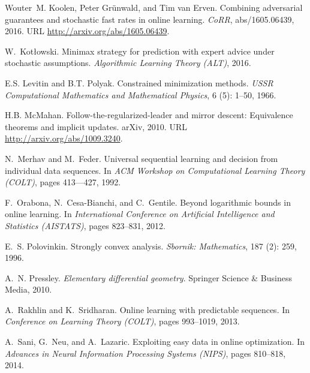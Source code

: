 \documentclass[english]{article}
\begin{document}
\begin{thebibliography}{30}
Wouter~M. Koolen, Peter Gr{\"{u}}nwald, and Tim van Erven.
\newblock Combining adversarial guarantees and stochastic fast rates in online
  learning.
\newblock \emph{CoRR}, abs/1605.06439, 2016.
\newblock URL \url{http://arxiv.org/abs/1605.06439}.

W.~Kot{\l}owski.
\newblock Minimax strategy for prediction with expert advice under stochastic
  assumptions.
\newblock \emph{Algorithmic Learning Theory (ALT)}, 2016.

E.S. Levitin and B.T. Polyak.
\newblock Constrained minimization methods.
\newblock \emph{USSR Computational Mathematics and Mathematical Physics},
  6 (5): 1--50, 1966.

H.B. McMahan.
\newblock Follow-the-regularized-leader and mirror descent: Equivalence
  theorems and implicit updates.
\newblock arXiv, 2010.
\newblock URL \url{http://arxiv.org/abs/1009.3240}.

N.~Merhav and M.~Feder.
\newblock Universal sequential learning and decision from individual data
  sequences.
\newblock In \emph{ACM Workshop on Computational Learning Theory
  (COLT)}, pages 413---427, 1992.

F.~Orabona, N.~Cesa-Bianchi, and C.~Gentile.
\newblock Beyond logarithmic bounds in online learning.
\newblock In \emph{International Conference on
  Artificial Intelligence and Statistics (AISTATS)}, pages 823--831, 2012.

E.~S. Polovinkin.
\newblock Strongly convex analysis.
\newblock \emph{Sbornik: Mathematics}, 187 (2): 259, 1996.

A.~N. Pressley.
\newblock \emph{Elementary differential geometry}.
\newblock Springer Science \& Business Media, 2010.

A.~Rakhlin and K.~Sridharan.
\newblock Online learning with predictable sequences.
\newblock In \emph{Conference on Learning Theory (COLT)}, pages
  993--1019, 2013.

A.~Sani, G.~Neu, and A.~Lazaric.
\newblock Exploiting easy data in online optimization.
\newblock In \emph{Advances in Neural Information Processing Systems (NIPS)},
  pages 810--818, 2014.


\end{thebibliography}
\end{document}
